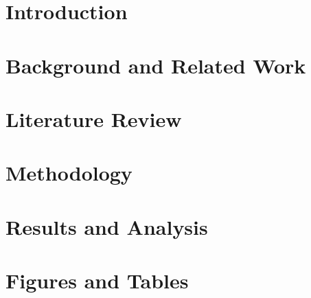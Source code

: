 \documentclass[conference]{IEEEtran}
\title{\VAR{paper_title}}
\author{\VAR{author_block}}
\begin{document}
\maketitle

\begin{abstract}
\end{abstract}

\begin{IEEEkeywords}
\end{IEEEkeywords}

\section{Introduction}

\section{Background and Related Work}

\section{Literature Review}

\section{Methodology}

\section{Results and Analysis}

\section{Figures and Tables}
\end{document}
